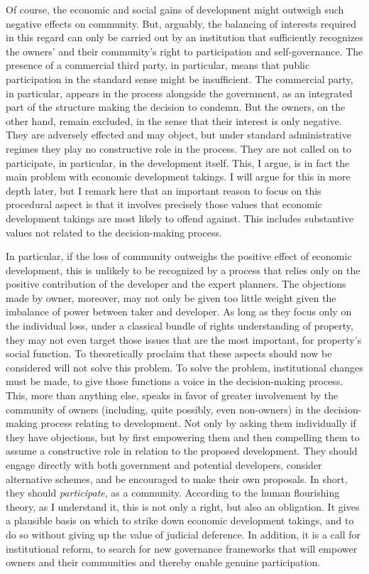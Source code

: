 Of course, the economic and social gains of development might outweigh such negative effects on community. But, arguably, the balancing of interests required in this regard can only be carried out by an institution that sufficiently recognizes the owners' and their community's right to participation and self-governance. The presence of a commercial third party, in particular, means that public participation in the standard sense might be insufficient. The commercial party, in particular, appears in the process alongside the government, as an integrated part of the structure making the decision to condemn. But the owners, on the other hand, remain excluded, in the sense that their interest is only negative. They are adversely effected and may object, but under standard administrative regimes they play no constructive role in the process. They are not called on to participate, in particular, in the development itself. This, I argue, is in fact the main problem with economic development takings. I will argue for this in more depth later, but I remark here that an important reason to focus on this procedural aspect is that it involves precisely those values that economic development takings are most likely to offend against. This includes substantive values not related to the decision-making process. 

In particular, if the loss of community outweighs the positive effect of economic development, this is unlikely to be recognized by a process that relies only on the positive contribution of the developer and the expert planners. The objections made by owner, moreover, may not only be given too little weight given the imbalance of power between taker and developer. As long as they focus only on the individual loss, under a classical bundle of rights understanding of property, they may not even target those issues that are the most important, for property's social function. To theoretically proclaim that these aspects should now be considered will not solve this problem. To solve the problem, institutional changes must be made, to give those functions a voice in the decision-making process. This, more than anything else, speaks in favor of greater involvement by the community of owners (including, quite possibly, even non-owners) in the decision-making process relating to development. Not only by asking them individually if they have objections, but by first empowering them and then compelling them to assume a constructive role in relation to the proposed development. They should engage directly with both government and potential developers, consider alternative schemes, and be encouraged to make their own proposals. In short, they should {\it participate}, as a community. According to the human flourishing theory, as I understand it, this is not only a right, but also an obligation. It gives a plausible basis on which to strike down economic development takings, and to do so without giving up the value of judicial deference. In addition, it is a call for institutional reform, to search for new governance frameworks that will empower owners and their communities and thereby enable genuine participation. 

